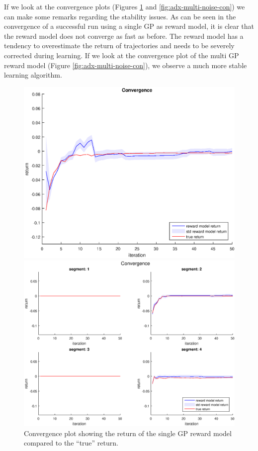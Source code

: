 \documentclass[mscThesis.tex]{subfiles}
\begin{document}
If we look at the convergence plots (Figures \ref{fig:adx-single-noise-con} and \ref{fig:adx-multi-noise-con}) we can make some remarks regarding the stability issues. As can be seen in the convergence of a successful run using a single GP as reward model, it is clear that the reward model does not converge as fast as before. The reward model has a tendency to overestimate the return of trajectories and needs to be severely corrected during learning. If we look at the convergence plot of the multi GP reward model (Figure \ref{fig:adx-multi-noise-con}), we observe a much more stable learning algorithm.


\begin{figure}[!htb]
    \centering
    \begin{minipage}{.5\textwidth}
        \centering
        \includegraphics[width=\textwidth, keepaspectratio=1]{figures/results/advancedx/convergence_single_noise.eps}
        \caption{Convergence plot showing the return of the single GP reward model compared to the ``true'' return.}
        \label{fig:adx-single-noise-con}
    \end{minipage}%
    \begin{minipage}{0.5\textwidth}
        \centering
        \includegraphics[width=\textwidth, keepaspectratio=1]{figures/results/advancedx/convergence_multi_noise.eps}

\end{minipage}
\end{figure}
\end{document}
